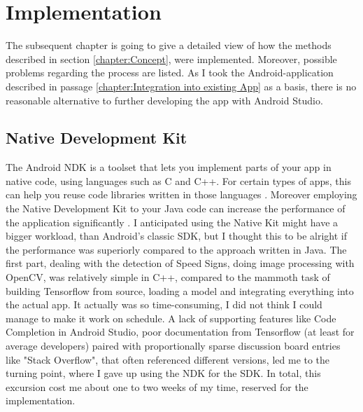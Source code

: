 
\chapter{Implementation}\label{chapter:Implementation}
The subsequent chapter is going to give a detailed view of how the methods described in section \ref{chapter:Concept}, were implemented. Moreover, possible problems regarding the process are listed. 
As I took the Android-application described in passage \ref{chapter:Integration into existing App} as a basis, there is no reasonable alternative to further developing the app with Android Studio.

\section{Native Development Kit}
The Android NDK is a toolset that lets you implement parts of your app in native code, using languages such as C and C++. For certain types of apps, this can help you reuse code libraries written in those languages \cite{androidndk}. Moreover employing the Native Development Kit to your Java code can increase the performance of the application significantly  \cite{ndkspeed}. I anticipated using the Native Kit might have a bigger workload, than Android's classic SDK, but I thought this to be alright if the performance was superiorly compared to the approach written in Java. \newline
The first part, dealing with the detection of Speed Signs, doing image processing with OpenCV,  was relatively simple in C++, compared to the mammoth task of building Tensorflow from source, loading a model and integrating everything into the actual app. It actually was so time-consuming, I did not think I could manage to make it work on schedule. A lack of supporting features like Code Completion in Android Studio, poor documentation from Tensorflow (at least for average developers) paired with proportionally sparse discussion board entries like "Stack Overflow", that often referenced different versions, led me to the turning point, where I gave up using the NDK for the SDK. In total, this excursion cost me about one to two weeks of my time, reserved for the implementation.  


